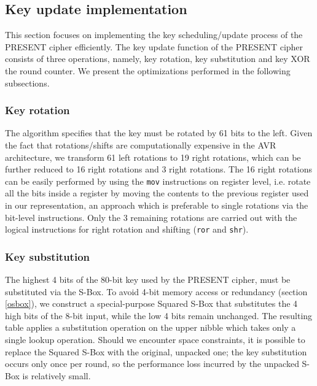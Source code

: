 \documentclass[11pt]{article}
\begin{document}
\subsection{Key update implementation}
This section focuses on implementing the key scheduling/update process of the PRESENT cipher efficiently. The key update function of the PRESENT cipher consists of three operations, namely, key rotation, key substitution and key XOR the round counter. We present the optimizations performed in the following subsections.
\subsubsection{Key rotation}
The algorithm specifies that the key must be rotated by 61 bits to the left. Given the fact that rotations/shifts are computationally expensive in the AVR architecture, we transform 61 left rotations to 19 right rotations, which can be further reduced to 16 right rotations and 3 right rotations. The 16 right rotations can be easily performed by using the \texttt{mov} instructions on register level, i.e. rotate all the bits inside a register by moving the contents to the previous register used in our representation, an approach which is preferable to single rotations via the bit-level instructions. Only the 3 remaining rotations are carried out with the logical instructions for right rotation and shifting (\texttt{ror} and \texttt{shr}).
\subsubsection{Key substitution}
The highest 4 bits of the 80-bit key used by the PRESENT cipher, must be substituted via the S-Box. To avoid 4-bit memory access or redundancy (section \ref{osbox}), we construct a special-purpose Squared S-Box that substitutes the 4 high bits of the 8-bit input, while the low 4 bits remain unchanged. The resulting table applies a substitution operation on the upper nibble which takes only a single lookup operation. Should we encounter space constraints, it is possible to replace the Squared S-Box with the original, unpacked one; the key substitution occurs only once per round, so the performance loss incurred by the unpacked S-Box is relatively small. 

\end{document}
